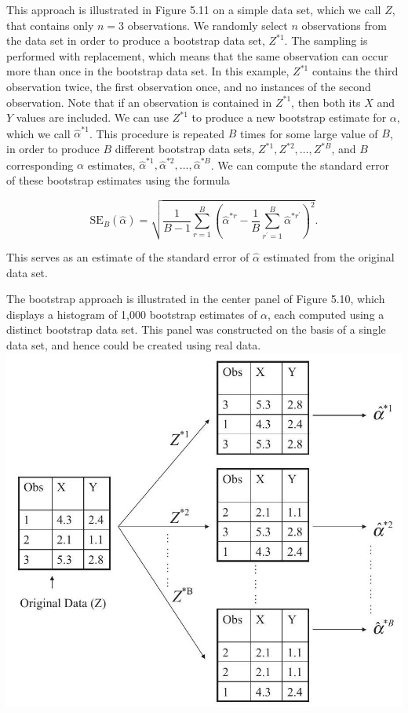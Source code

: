 \documentclass[10pt]{article}
\begin{document}
This approach is illustrated in Figure 5.11 on a simple data set, which we call $Z$, that contains only $n=3$ observations. We randomly select $n$ observations from the data set in order to produce a bootstrap data set, $Z^{* 1}$. The sampling is performed with replacement, which means that the same observation can occur more than once in the bootstrap data set. In this example, $Z^{* 1}$ contains the third observation twice, the first observation once, and no instances of the second observation. Note that if an observation is contained in $Z^{* 1}$, then both its $X$ and $Y$ values are included. We can use $Z^{* 1}$ to produce a new bootstrap estimate for $\alpha$, which we call $\hat{\alpha}^{* 1}$. This procedure is repeated $B$ times for some large value of $B$, in order to produce $B$ different bootstrap data sets, $Z^{* 1}, Z^{* 2}, \ldots, Z^{* B}$, and $B$ corresponding $\alpha$ estimates, $\hat{\alpha}^{* 1}, \hat{\alpha}^{* 2}, \ldots, \hat{\alpha}^{* B}$. We can compute the standard error of these bootstrap estimates using the formula


\begin{equation*}
\mathrm{SE}_{B}(\hat{\alpha})=\sqrt{\frac{1}{B-1} \sum_{r=1}^{B}\left(\hat{\alpha}^{* r}-\frac{1}{B} \sum_{r^{\prime}=1}^{B} \hat{\alpha}^{* r^{\prime}}\right)^{2}} . \tag{5.8}
\end{equation*}


This serves as an estimate of the standard error of $\hat{\alpha}$ estimated from the original data set.

The bootstrap approach is illustrated in the center panel of Figure 5.10, which displays a histogram of 1,000 bootstrap estimates of $\alpha$, each computed using a distinct bootstrap data set. This panel was constructed on the basis of a single data set, and hence could be created using real data.\\
\includegraphics[max width=\textwidth, center]{2025_05_05_efe77898333945044de4g-205}
\end{document}
